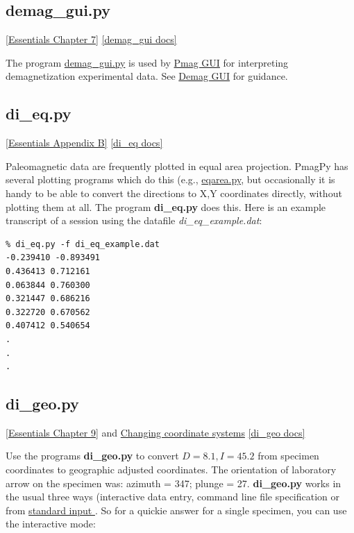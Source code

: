 \documentclass[11pt]{book}
\begin{document}
{{\subsection{demag\_gui.py}
\href{http://earthref.org/MAGIC/books/Tauxe/Essentials/WebBook3ch7.html}{[Essentials Chapter 7]}
\href{https://github.com/PmagPy/PmagPy/blob/master/demag_gui.py}{[demag\_gui docs]}

The program \href{#DemagGUI}{demag\_gui.py} is used by \href{#pmag_gui.py}{Pmag GUI} for interpreting demagnetization experimental data.   See \href{#demag_gui.py}{Demag GUI} for guidance.


\subsection{di\_eq.py}
\href{http://earthref.org/MAGIC/books/Tauxe/Essentials/WebBook3ap2.html#equal_area}{[Essentials Appendix B]}
\href{https://github.com/PmagPy/PmagPy/blob/master/programs/di_eq.py}{[di\_eq docs]}

Paleomagnetic data are frequently plotted in equal area projection.  PmagPy has several plotting programs which do this (e.g., \href{#eqarea.py}{eqarea.py}, but occasionally it is handy to be able to convert the directions to X,Y coordinates directly, without plotting them at all.  The program {\bf di\_eq.py} does this.  Here is an example transcript of a session using the datafile {\it di\_eq\_example.dat}:

\begin{verbatim}
% di_eq.py -f di_eq_example.dat
-0.239410 -0.893491
0.436413 0.712161
0.063844 0.760300
0.321447 0.686216
0.322720 0.670562
0.407412 0.540654
.
.
.
\end{verbatim}

\subsection{di\_geo.py}
\href{http://earthref.org/MAGIC/books/Tauxe/Essentials/WebBook3ch9.html#ch9}{[Essentials Chapter 9]} and
\href{http://earthref.org/MAGIC/books/Tauxe/Essentials/WebBook3ap1.html#Changing_coordinate_systems}{Changing coordinate systems}
\href{https://github.com/PmagPy/PmagPy/blob/master/programs/di_geo.py}{[di\_geo docs]}

Use the programs {\bf di\_geo.py}  to convert
$D=8.1, I=45.2$ from specimen coordinates  to geographic  adjusted coordinates. The
orientation of laboratory arrow on the specimen was: azimuth = 347;
plunge = 27.
{\bf di\_geo.py} works in the usual three ways (interactive data entry, command line file specification or from  \href{#standard_IO}{standard input }.  So for a quickie answer for a single specimen, you can use the interactive mode:

}}
\end{document}
